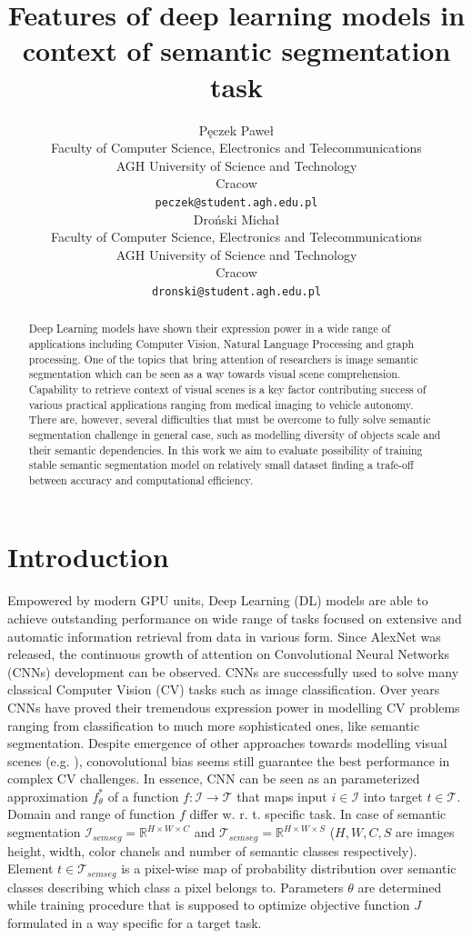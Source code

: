 \documentclass{article}
\title{Features of deep learning models in context of semantic segmentation task}
\author{
 Pęczek Paweł \\
  Faculty of Computer Science, Electronics and Telecommunications\\
  AGH University of Science and Technology \\
  Cracow \\
  \texttt{peczek@student.agh.edu.pl} \\
  \And
 Droński Michał \\
  Faculty of Computer Science, Electronics and Telecommunications\\
  AGH University of Science and Technology \\
  Cracow \\
  \texttt{dronski@student.agh.edu.pl} \\
}
\begin{document}
\maketitle
\begin{abstract}
Deep Learning models have shown their expression power in a wide range of applications including Computer Vision, Natural Language Processing and graph processing. One of the topics that bring attention of researchers is image semantic segmentation which can be seen as a way towards visual scene comprehension. Capability to retrieve context of visual scenes is a key factor contributing success of various practical applications ranging from medical imaging to vehicle autonomy. There are, however, several difficulties that must be overcome to fully solve semantic segmentation challenge in general case, such as modelling diversity of objects scale and their semantic dependencies. In this work we aim to evaluate possibility of training stable semantic segmentation model on relatively small dataset finding a trafe-off between accuracy and computational efficiency. 
\end{abstract}

\raggedbottom
\section{Introduction}
\paragraph{}
Empowered by modern GPU units, Deep Learning (DL) models are able to achieve outstanding performance on wide range of tasks focused on extensive and automatic information retrieval from data in various form. Since AlexNet \cite{alex} was released, the continuous growth of attention on Convolutional Neural Networks (CNNs) development can be observed. CNNs are successfully used to solve many classical Computer Vision (CV) tasks such as image classification. Over years CNNs have proved their tremendous expression power in modelling CV problems ranging from classification to much more sophisticated ones, like semantic segmentation. Despite emergence of other approaches towards modelling visual scenes (e.g. \cite{scae}), conovolutional bias seems still guarantee the best performance in complex CV challenges. In essence, CNN can be seen as an parameterized approximation $f^{*}_{\theta}$ of a function $f: \mathcal{I} \rightarrow \mathcal{T}$ that maps input $i \in \mathcal{I}$ into target $t \in \mathcal{T}$. Domain and range of function $f$ differ w. r. t. specific task. In case of semantic segmentation $\mathcal{I}_{semseg} = \mathbb{R}^{H \times W \times C}$ and $\mathcal{T}_{semseg} = \mathbb{R}^{H \times W \times S}$ ($H, W, C, S$ are images height, width, color chanels and number of semantic classes respectively). Element $t \in \mathcal{T}_{semseg}$ is a pixel-wise map of probability distribution over semantic classes describing which class a pixel belongs to. Parameters $\theta$ are determined while training procedure that is supposed to optimize objective function $J$ formulated in a way specific for a target task. 
\end{document}
